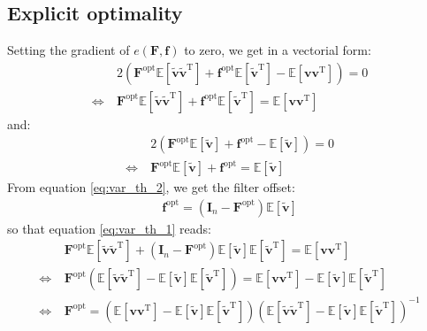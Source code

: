 \documentclass[12pt]{scrartcl}
\begin{document}
\subsection{Explicit optimality}
Setting the gradient of $e(\mathbf{F},\mathbf{f})$ to zero, we get in a vectorial form:
\begin{align}
\label{eq:var_th_1}
& 2 \left(\mathbf{F}^\mathrm{opt} \mathbb{E}\left[\widetilde{\mathbf{v}} \widetilde{\mathbf{v}}^\mathrm{T}\right] + \mathbf{f}^\mathrm{opt} \mathbb{E}\left[\widetilde{\mathbf{v}}^\mathrm{T}\right] - \mathbb{E}\left[\mathbf{v} \mathbf{v}^\mathrm{T}\right]\right) = 0 \nonumber \\
\Leftrightarrow \ & \mathbf{F}^\mathrm{opt} \mathbb{E}\left[\widetilde{\mathbf{v}} \widetilde{\mathbf{v}}^\mathrm{T}\right] + \mathbf{f}^\mathrm{opt} \mathbb{E}\left[\widetilde{\mathbf{v}}^\mathrm{T}\right] = \mathbb{E}\left[\mathbf{v} \mathbf{v}^\mathrm{T}\right]
\end{align}
and:
\begin{align}
\label{eq:var_th_2}
& 2 \left(\mathbf{F}^\mathrm{opt} \mathbb{E}\left[\widetilde{\mathbf{v}} \right] + \mathbf{f}^\mathrm{opt} - \mathbb{E}\left[\widetilde{\mathbf{v}}\right]\right) = 0 \nonumber \\
\Leftrightarrow \ & \mathbf{F}^\mathrm{opt} \mathbb{E}\left[\widetilde{\mathbf{v}} \right] + \mathbf{f}^\mathrm{opt} = \mathbb{E}\left[\widetilde{\mathbf{v}}\right]
\end{align}
From equation \eqref{eq:var_th_2}, we get the filter offset:
\begin{align}
\mathbf{f}^\mathrm{opt} = \left(\mathbf{I}_n - \mathbf{F}^\mathrm{opt}\right) \mathbb{E}\left[\widetilde{\mathbf{v}}\right]
\end{align}
so that equation \eqref{eq:var_th_1} reads:
\begin{align}
& \mathbf{F}^\mathrm{opt} \mathbb{E}\left[\widetilde{\mathbf{v}} \widetilde{\mathbf{v}}^\mathrm{T}\right] + \left(\mathbf{I}_n - \mathbf{F}^\mathrm{opt}\right) \mathbb{E}\left[\widetilde{\mathbf{v}}\right] \mathbb{E}\left[\widetilde{\mathbf{v}}^\mathrm{T}\right] = \mathbb{E}\left[\mathbf{v} \mathbf{v}^\mathrm{T}\right] \nonumber \\
\Leftrightarrow \ & \mathbf{F}^\mathrm{opt} \left(\mathbb{E}\left[\widetilde{\mathbf{v}} \widetilde{\mathbf{v}}^\mathrm{T}\right] - \mathbb{E}\left[\widetilde{\mathbf{v}}\right] \mathbb{E}\left[\widetilde{\mathbf{v}}^\mathrm{T}\right]\right) = \mathbb{E}\left[\mathbf{v} \mathbf{v}^\mathrm{T}\right] - \mathbb{E}\left[\widetilde{\mathbf{v}}\right] \mathbb{E}\left[\widetilde{\mathbf{v}}^\mathrm{T}\right] \nonumber \\
\Leftrightarrow \ & \mathbf{F}^\mathrm{opt} = \left(\mathbb{E}\left[\mathbf{v} \mathbf{v}^\mathrm{T}\right] - \mathbb{E}\left[\widetilde{\mathbf{v}}\right] \mathbb{E}\left[\widetilde{\mathbf{v}}^\mathrm{T}\right]\right)\left(\mathbb{E}\left[\widetilde{\mathbf{v}} \widetilde{\mathbf{v}}^\mathrm{T}\right] - \mathbb{E}\left[\widetilde{\mathbf{v}}\right] \mathbb{E}\left[\widetilde{\mathbf{v}}^\mathrm{T}\right]\right)^{-1}
\end{align}
\end{document}
